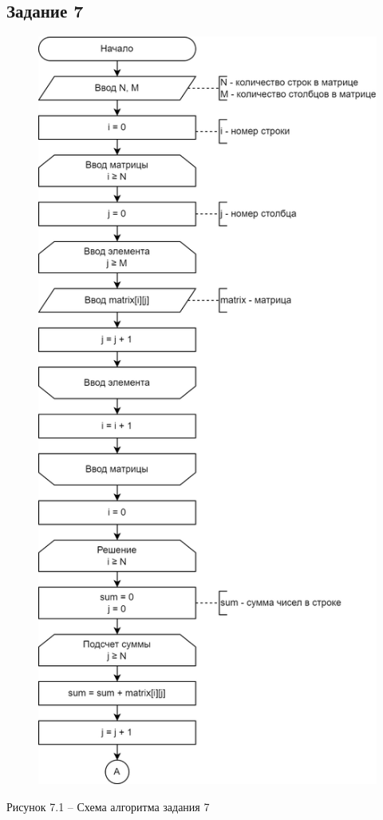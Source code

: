 \documentclass[a4paper,14pt]{extarticle}
\begin{document}
  \subsection*{Задание 7}
  \begin{figure}[h]
    \centering
    \includegraphics[width=0.53\linewidth]{schemes/s-7-1}
  \end{figure}
  \begin{center}
    Рисунок 7.1 – Схема алгоритма задания 7
  \end{center}
\end{document}
